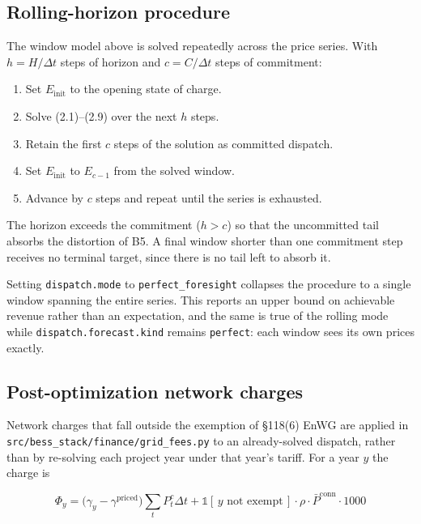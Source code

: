 \documentclass[11pt,a4paper]{article}
\numberwithin{equation}{section}
\begin{document}
\subsection{Rolling-horizon procedure}

The window model above is solved repeatedly across the price series. With
$h = H / \Delta t$ steps of horizon and $c = C / \Delta t$ steps of commitment:

\begin{enumerate}
  \item Set $E_{\text{init}}$ to the opening state of charge.
  \item Solve (2.1)--(2.9) over the next $h$ steps.
  \item Retain the first $c$ steps of the solution as committed dispatch.
  \item Set $E_{\text{init}}$ to $E_{c-1}$ from the solved window.
  \item Advance by $c$ steps and repeat until the series is exhausted.
\end{enumerate}

The horizon exceeds the commitment ($h > c$) so that the uncommitted tail
absorbs the distortion of B5. A final window shorter than one commitment step
receives no terminal target, since there is no tail left to absorb it.

Setting \nolinkurl{dispatch.mode} to \nolinkurl{perfect_foresight} collapses the
procedure to a single window spanning the entire series. This reports an upper
bound on achievable revenue rather than an expectation, and the same is true of
the rolling mode while \nolinkurl{dispatch.forecast.kind} remains \texttt{perfect}:
each window sees its own prices exactly.

\subsection{Post-optimization network charges}

Network charges that fall outside the exemption of \S118(6) EnWG are applied in
\nolinkurl{src/bess_stack/finance/grid_fees.py} to an already-solved dispatch,
rather than by re-solving each project year under that year's tariff. For a year
$y$ the charge is

\begin{equation}
\Phi_y = \big( \gamma_y - \gamma^{\text{priced}} \big) \sum_{t} P^{c}_{t} \Delta t
       + \mathbb{1}[\,y \text{ not exempt}\,] \cdot \rho \cdot \bar{P}^{\text{conn}} \cdot 1000
\end{equation}
\end{document}
